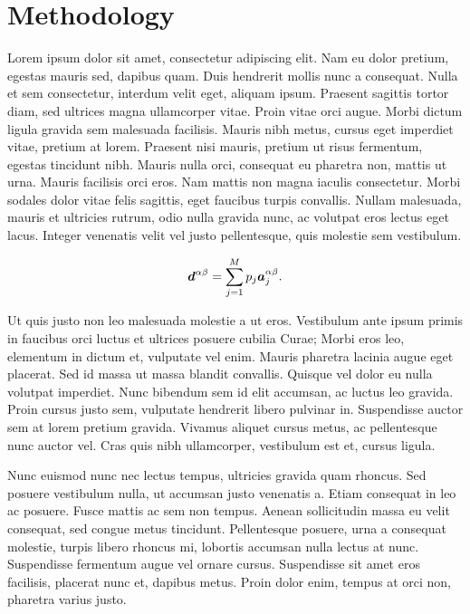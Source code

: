 \documentclass[extra,mreferee]{gji}
\begin{document}
\section{Methodology}

Lorem ipsum dolor sit amet, consectetur adipiscing elit. Nam eu dolor pretium,
egestas mauris sed, dapibus quam. Duis hendrerit mollis nunc a consequat. Nulla
et sem consectetur, interdum velit eget, aliquam ipsum. Praesent sagittis
tortor diam, sed ultrices magna ullamcorper vitae. Proin vitae orci augue.
Morbi dictum ligula gravida sem malesuada facilisis. Mauris nibh metus, cursus
eget imperdiet vitae, pretium at lorem. Praesent nisi mauris, pretium ut risus
fermentum, egestas tincidunt nibh. Mauris nulla orci, consequat eu pharetra
non, mattis ut urna. Mauris facilisis orci eros. Nam mattis non magna iaculis
consectetur. Morbi sodales dolor vitae felis sagittis, eget faucibus turpis
convallis. Nullam malesuada, mauris et ultricies rutrum, odio nulla gravida
nunc, ac volutpat eros lectus eget lacus. Integer venenatis velit vel justo
pellentesque, quis molestie sem vestibulum.

\begin{equation}
    \mitbf{d}^{\alpha\beta} = \sum\limits_{j=1}^{M} p_j \mitbf{a}_j^{\alpha\beta}.
    \label{eq:dalphabeta_sum}
\end{equation}

Ut quis justo non leo malesuada molestie a ut eros. Vestibulum ante ipsum
primis in faucibus orci luctus et ultrices posuere cubilia Curae; Morbi eros
leo, elementum in dictum et, vulputate vel enim. Mauris pharetra lacinia augue
eget placerat. Sed id massa ut massa blandit convallis. Quisque vel dolor eu
nulla volutpat imperdiet. Nunc bibendum sem id elit accumsan, ac luctus leo
gravida. Proin cursus justo sem, vulputate hendrerit libero pulvinar in.
Suspendisse auctor sem at lorem pretium gravida. Vivamus aliquet cursus metus,
ac pellentesque nunc auctor vel. Cras quis nibh ullamcorper, vestibulum est et,
cursus ligula.

Nunc euismod nunc nec lectus tempus, ultricies gravida quam rhoncus. Sed
posuere vestibulum nulla, ut accumsan justo venenatis a. Etiam consequat in leo
ac posuere. Fusce mattis ac sem non tempus. Aenean sollicitudin massa eu velit
consequat, sed congue metus tincidunt. Pellentesque posuere, urna a consequat
molestie, turpis libero rhoncus mi, lobortis accumsan nulla lectus at nunc.
Suspendisse fermentum augue vel ornare cursus. Suspendisse sit amet eros
facilisis, placerat nunc et, dapibus metus. Proin dolor enim, tempus at orci
non, pharetra varius justo.
\end{document}
